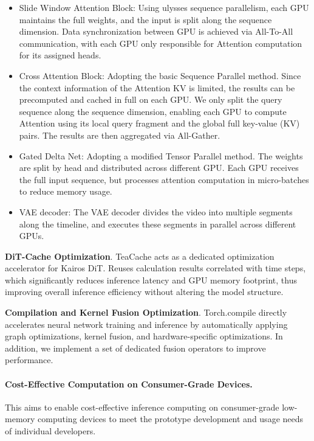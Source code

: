\documentclass{llmxive}
\begin{document}
\begin{itemize}
    \item Slide Window Attention Block: Using ulysses sequence parallelism, each GPU maintains the full weights, and the input is split along the sequence dimension. Data synchronization between GPU is achieved via All-To-All communication, with each GPU only responsible for Attention computation for its assigned heads.
    
    \item Cross Attention Block: Adopting the basic Sequence Parallel method. Since the context information of the Attention KV is limited, the results can be precomputed and cached in full on each GPU. We only split the query sequence along the sequence dimension, enabling each GPU to compute Attention using its local query fragment and the global full key-value (KV) pairs. The results are then aggregated via All-Gather.
    
    \item Gated Delta Net: Adopting a modified Tensor Parallel method. The weights are split by head and distributed across different GPU. Each GPU receives the full input sequence, but processes attention computation in micro-batches to reduce memory usage.

    \item VAE decoder: The VAE decoder divides the video into multiple segments along the timeline, and executes these segments in parallel across different GPUs.
    
\end{itemize}

\textbf {DiT-Cache Optimization}. TeaCache acts as a dedicated optimization accelerator for Kairos DiT. Reuses calculation results correlated with time steps, which significantly reduces inference latency and GPU memory footprint, thus improving overall inference efficiency without altering the model structure.
    
\textbf {Compilation and Kernel Fusion Optimization}. Torch.compile directly accelerates neural network training and inference by automatically applying graph optimizations, kernel fusion, and hardware-specific optimizations. In addition, we implement a set of dedicated fusion operators to improve performance.
     


\paragraph{Cost-Effective Computation on Consumer-Grade Devices.}
This aims to enable cost-effective inference computing on consumer-grade low-memory computing devices to meet the prototype development and usage needs of individual developers.
\end{document}
